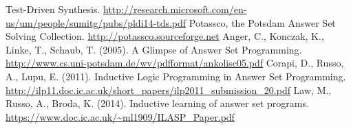 \documentclass[a4paper,twoside,notitlepage]{report}
\begin{document}
\begin{thebibliography}{9}
        Test-Driven Synthesis.
        \url{http://research.microsoft.com/en-us/um/people/sumitg/pubs/pldi14-tds.pdf}
        Potassco, the Potsdam Answer Set Solving Collection.
        \url{http://potassco.sourceforge.net}
        Anger, C., Konczak, K., Linke, T., Schaub, T. (2005).
        A Glimpse of Answer Set Programming.
        \url{http://www.cs.uni-potsdam.de/wv/pdfformat/ankolisc05.pdf}
        Corapi, D., Russo, A., Lupu, E. (2011).
        Inductive Logic Programming in Answer Set Programming.
        \url{http://ilp11.doc.ic.ac.uk/short_papers/ilp2011_submission_20.pdf}
        Law, M., Russo, A., Broda, K. (2014).
        Inductive learning of answer set programs.
        \url{https://www.doc.ic.ac.uk/~ml1909/ILASP_Paper.pdf}
\end{thebibliography}
\end{document}
